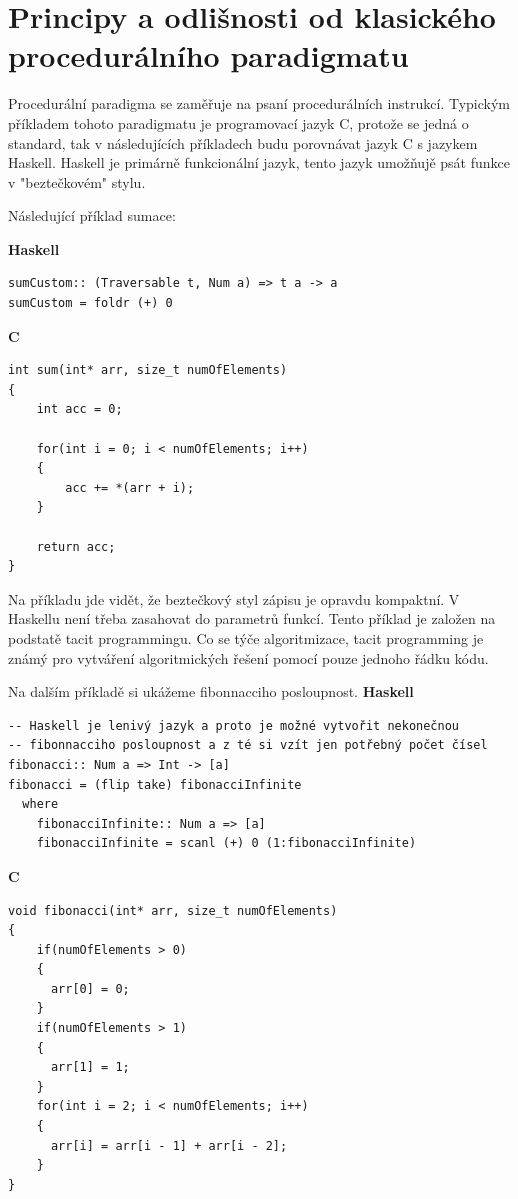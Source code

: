 \documentclass[male,czech]{kithesis}
\begin{document}
\section{Principy a odlišnosti od klasického procedurálního paradigmatu}

Procedurální paradigma se zaměřuje na psaní procedurálních instrukcí.
Typickým příkladem tohoto paradigmatu je programovací jazyk C, protože se
jedná o standard, tak v následujících příkladech budu porovnávat jazyk C s jazykem Haskell.
Haskell je primárně funkcionální jazyk, tento jazyk umožňujě psát funkce
v "beztečkovém" stylu. 

Následující příklad sumace:

\textbf{Haskell}
\begin{verbatim}
sumCustom:: (Traversable t, Num a) => t a -> a
sumCustom = foldr (+) 0
\end{verbatim}
\pagebreak
\textbf{C}
\begin{verbatim}
int sum(int* arr, size_t numOfElements)
{
    int acc = 0;
    
    for(int i = 0; i < numOfElements; i++)
    {
        acc += *(arr + i);
    }
    
    return acc;
}
\end{verbatim}
Na příkladu jde vidět, že beztečkový styl zápisu je opravdu kompaktní. 
V Haskellu není třeba zasahovat do parametrů funkcí.
Tento příklad je založen na podstatě tacit programmingu.
Co se týče algoritmizace, tacit programming je známý pro vytváření 
algoritmických řešení pomocí pouze jednoho řádku kódu. 

Na dalším příkladě si ukážeme fibonnacciho posloupnost.
\textbf{Haskell}
\begin{verbatim}
-- Haskell je lenivý jazyk a proto je možné vytvořit nekonečnou 
-- fibonnacciho posloupnost a z té si vzít jen potřebný počet čísel 
fibonacci:: Num a => Int -> [a]
fibonacci = (flip take) fibonacciInfinite
  where
    fibonacciInfinite:: Num a => [a]
    fibonacciInfinite = scanl (+) 0 (1:fibonacciInfinite)
\end{verbatim}

\vfill
\pagebreak

\textbf{C}
\begin{verbatim}
void fibonacci(int* arr, size_t numOfElements)
{
    if(numOfElements > 0)
    {
      arr[0] = 0;
    }
    if(numOfElements > 1)
    {
      arr[1] = 1;
    }
    for(int i = 2; i < numOfElements; i++)
    {
      arr[i] = arr[i - 1] + arr[i - 2];
    }
}
\end{verbatim}
\end{document}
